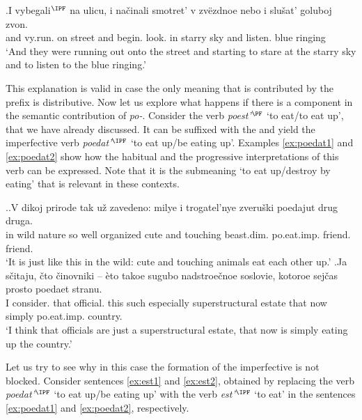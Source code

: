 \exg.\label{ex:vybegat}I vybegali$^{\IPF}$ na ulicu, i na\v{c}inali smotret' v zv\"{e}zdnoe nebo i slu\v{s}at' goluboj zvon.\\
and vy.run. on street and begin. look. in starry sky and listen. blue ringing\\
\trans `And they were running out onto the street and starting to stare at the starry sky and to listen to the blue ringing.'

This explanation is valid in case the only meaning that is contributed by the prefix is distributive. Now let us explore what happens if there is a  component in the semantic contribution of \textit{po-}. Consider the verb \textit{poest'}$^{\PF}$ `to eat/to eat up', that we have already discussed. It can be suffixed with the  and yield the imperfective verb \textit{poedat'}$^{\IPF}$ `to eat up/be eating up'. Examples \ref{ex:poedat1} and \ref{ex:poedat2} show how the habitual and the progressive interpretations of this verb can be expressed. Note that it is the submeaning `to eat up/destroy by eating' that is relevant in these contexts.

\ex.\ag.\label{ex:poedat1}V dikoj prirode tak u\v{z} zavedeno: milye i trogatel'nye zveru\v{s}ki poedajut drug druga.\\
in wild nature so well organized cute and touching beast.dim. po.eat.imp. friend. friend.\\
\trans `It is just like this in the wild: cute and touching animals eat each other up.'
\bg.\label{ex:poedat2}Ja s\v{c}itaju, \v{c}to \v{c}inovniki -- \`{e}to takoe sugubo nadstroe\v{c}noe soslovie, kotoroe sej\v{c}as prosto poedaet stranu.\\
I consider. that official. {} this such especially superstructural estate that now simply po.eat.imp. country.\\
\trans `I think that officials are just a superstructural estate, that now is simply eating up the country.'\\

Let us try to see why in this case the formation of the imperfective is not blocked. Consider sentences \ref{ex:est1} and \ref{ex:est2}, obtained by replacing the verb \textit{poedat'}$^{\IPF}$ `to eat up/be eating up' with the verb \textit{est'}$^{\IPF}$ `to eat' in the sentences \ref{ex:poedat1} and \ref{ex:poedat2}, respectively.
 
